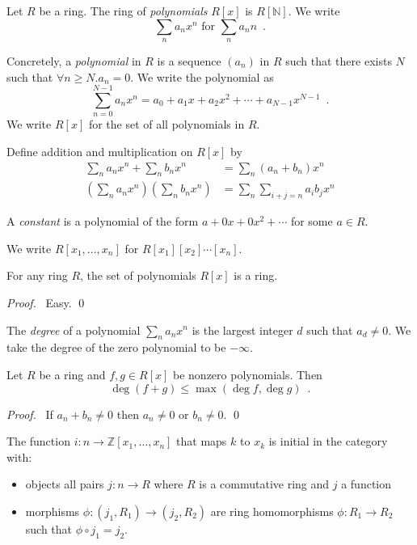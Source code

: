 \begin{df}[Polynomial]
Let $R$ be a ring. The ring of \emph{polynomials} $R[x]$ is $R[\mathbb{N}]$. We write 
\[ \sum_n a_n x^n \text{ for } \sum_n a_n n \enspace . \]

Concretely, a \emph{polynomial} in $R$ is a sequence $(a_n)$ in $R$ such that there exists $N$ such that $\forall n \geq N. a_n = 0$. We write the polynomial as
\[ \sum_{n=0}^{N-1} a_n x^n = a_0 + a_1 x + a_2 x^2 + \cdots + a_{N-1} x^{N-1} \enspace . \]
We write $R[x]$ for the set of all polynomials in $R$.

Define addition and multiplication on $R[x]$ by
\begin{align*}
\sum_n a_n x^n + \sum_n b_n x^n & = \sum_n (a_n + b_n) x^n \\
\left( \sum_n a_n x^n \right) \left( \sum_n b_n x^n \right) & = \sum_n \sum_{i+j=n} a_i b_j x^n
\end{align*}

A \emph{constant} is a polynomial of the form $a + 0x + 0x^2 + \cdots$ for some $a \in R$.

We write $R[x_1, \ldots, x_n]$ for $R[x_1][x_2] \cdots [x_n]$.
\end{df}

\begin{prop}
For any ring $R$, the set of polynomials $R[x]$ is a ring.
\end{prop}

\begin{proof}
\pf\ Easy. \qed
\end{proof}

\begin{df}[Degree]
The \emph{degree} of a polynomial $\sum_n a_n x^n$ is the largest integer $d$ such that $a_d \neq 0$. We take the degree of the zero polynomial to be $- \infty$.
\end{df}

\begin{prop}
Let $R$ be a ring and $f,g \in R[x]$ be nonzero polynomials. Then
\[ \deg(f + g) \leq \max(\deg f, \deg g) \enspace . \]
\end{prop}

\begin{proof}
\pf\ If $a_n + b_n \neq 0$ then $a_n \neq 0$ or $b_n \neq 0$. \qed
\end{proof}

\begin{prop}
The function $i : n \rightarrow \mathbb{Z}[x_1, \ldots, x_n]$ that maps $k$ to $x_k$ is initial in the category with:
\begin{itemize}
\item objects all pairs $j : n \rightarrow R$ where $R$ is a commutative ring and $j$ a function
\item morphisms $\phi : (j_1, R_1) \rightarrow (j_2,R_2)$ are ring homomorphisms $\phi : R_1 \rightarrow R_2$ such that $\phi \circ j_1 = j_2$.
\end{itemize}
\end{prop}

